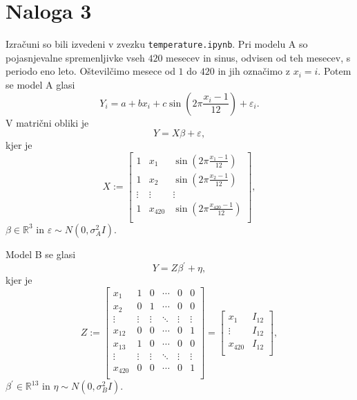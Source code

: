 \documentclass{article}
\begin{document}
\section*{Naloga 3}
Izračuni so bili izvedeni v zvezku \texttt{temperature.ipynb}. Pri modelu A so pojasnjevalne spremenljivke vseh $420$ mesecev in sinus, odvisen od teh mesecev, s periodo eno leto. Oštevilčimo mesece od $1$ do $420$ in jih označimo z $x_i = i$. Potem se model A glasi
\begin{equation*}
    Y_i = a + b x_i + c \sin \left(2\pi \frac{x_i - 1}{12}\right) + \varepsilon_i.
\end{equation*}
V matrični obliki je
\begin{equation*}
    Y = X \beta + \varepsilon,
\end{equation*}
kjer je
\begin{equation*}
    X := 
    \begin{bmatrix}
        1 & x_1 & \sin \left(2\pi \frac{x_1 - 1}{12}\right) \\
        1 & x_2 & \sin \left(2\pi \frac{x_2 - 1}{12}\right) \\
        \vdots & \vdots & \vdots \\
        1 & x_{420} & \sin \left(2\pi \frac{x_{420} - 1}{12}\right) \\
    \end{bmatrix},
\end{equation*}
$\beta \in \mathbb{R}^3$ in $\varepsilon \sim N \left(0, \sigma_A^2 I\right)$.

Model B se glasi
\begin{equation*}
    Y = Z \beta^\prime + \eta,
\end{equation*}
kjer je
\begin{equation*}
    Z :=
    \begin{bmatrix}
        x_1 & 1 & 0 & \cdots & 0 & 0 \\
        x_2 & 0 & 1 & \cdots & 0 & 0 \\
        \vdots & \vdots & \vdots & \ddots & \vdots & \vdots \\
        x_{12} & 0 & 0 & \cdots & 0 & 1 \\
        x_{13} & 1 & 0 & \cdots & 0 & 0 \\
        \vdots & \vdots & \vdots & \ddots & \vdots & \vdots \\
        x_{420} & 0 & 0 & \cdots & 0 & 1 \\
    \end{bmatrix}
    =
    \begin{bmatrix}
        x_1  & I_{12} \\
        \vdots &I_{12} \\
        x_{420}  & I_{12} \\
    \end{bmatrix},
\end{equation*}
$\beta^\prime \in \mathbb{R}^{13}$ in $\eta \sim N\left(0, \sigma_B^2 I\right)$.
\end{document}
